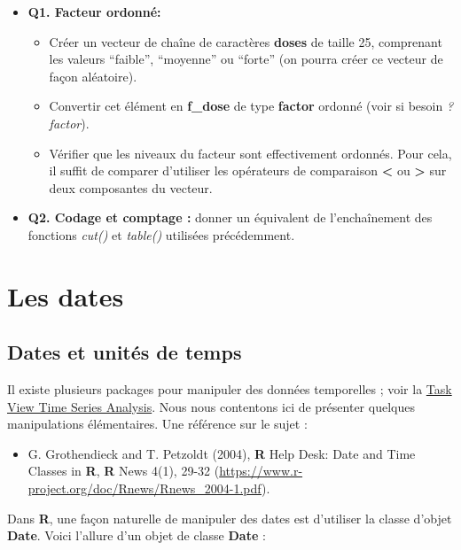 \documentclass[
]{book}
\providecommand{\tightlist}{%
  \setlength{\itemsep}{0pt}\setlength{\parskip}{0pt}}
\theoremstyle{definition}
\theoremstyle{definition}
\theoremstyle{definition}
\theoremstyle{definition}
\theoremstyle{remark}
\begin{document}
\begin{itemize}
\tightlist
\item
  \textbf{Q1. Facteur ordonné:}

  \begin{itemize}
  \tightlist
  \item
    Créer un vecteur de chaîne de caractères \textbf{doses} de taille 25, comprenant les valeurs ``faible'', ``moyenne'' ou ``forte'' (on pourra créer ce vecteur de façon aléatoire).
  \item
    Convertir cet élément en \textbf{f\_dose} de type \textbf{factor} ordonné (voir si besoin \emph{?factor}).
  \item
    Vérifier que les niveaux du facteur sont effectivement ordonnés. Pour cela, il suffit de comparer d'utiliser les opérateurs de comparaison \textbf{\textless{}} ou \textbf{\textgreater{}} sur deux composantes du vecteur.
  \end{itemize}
\item
  \textbf{Q2. Codage et comptage :} donner un équivalent de l'enchaînement des fonctions \emph{cut()} et \emph{table()} utilisées précédemment.
\end{itemize}

\hypertarget{les-dates}{%
\section{Les dates}\label{les-dates}}

\hypertarget{dates-et-unituxe9s-de-temps}{%
\subsection{Dates et unités de temps}\label{dates-et-unituxe9s-de-temps}}

Il existe plusieurs packages pour manipuler des données temporelles ; voir la \href{http://cran.r-project.org/web/views/TimeSeries.html}{Task View Time Series Analysis}. Nous nous contentons ici de présenter quelques manipulations élémentaires. Une référence sur le sujet :

\begin{itemize}
\tightlist
\item
  G. Grothendieck and T. Petzoldt (2004), \textbf{R} Help Desk: Date and Time Classes in \textbf{R}, \textbf{R} News 4(1), 29-32 (\url{https://www.r-project.org/doc/Rnews/Rnews_2004-1.pdf}).
\end{itemize}

Dans \textbf{R}, une façon naturelle de manipuler des dates est d'utiliser la classe d'objet \textbf{Date}. Voici l'allure d'un objet de classe \textbf{Date} :
\end{document}
